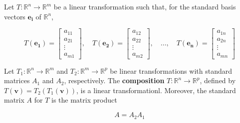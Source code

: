 \documentclass{report}
\begin{document}
\begin{tcolorbox}[title = Standard Matrix for a Linear Transformation]
	Let $T: \mathbb{R}^n \to \mathbb{R}^m$ be a linear transformation such that, for the standard basis vectors $\bm{e_i}$ of $\mathbb{R}^n$,
	
	$$
	T(\bm{e_1}) = \begin{bmatrix} a_{11} \\ a_{21} \\  \vdots \\ a_{m1} \end{bmatrix}, \quad T(\bm{e_2}) = \begin{bmatrix} a_{12} \\ a_{22} \\ \vdots \\ a_{m2} \end{bmatrix}, \quad \hdots, \quad T(\bm{e_n}) = \begin{bmatrix} a_{1n} \\ a_{2n} \\ \vdots \\ a_{mn} \end{bmatrix}
	$$
	
\end{tcolorbox}

\begin{tcolorbox}[title = Composition of Linear Transformations]
	Let $T_1: \mathbb{R}^n \to \mathbb{R}^m$ and $T_2: \mathbb{R}^m \to \mathbb{R}^p$ be linear transformations with standard matrices $A_1$ and $A_2$, respectively. The \textbf{composition} $T: \mathbb{R}^n \to \mathbb{R}^p$, defined by $T(\bm{v}) = T_2 (T_1 (\bm{v}))$, is a linear transformationl. Moreover, the standard matrix $A$ for $T$ is the matrix product 
	
	$$
	A = A_2 A_1 
	$$
\end{tcolorbox}
\end{document}
